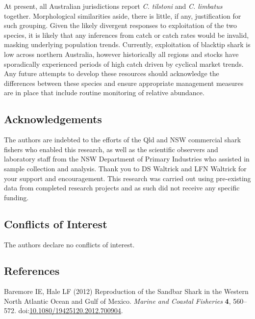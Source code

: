 \documentclass[]{article}
\begin{document}
At present, all Australian jurisdictions report \emph{C. tilstoni} and
\emph{C. limbatus} together. Morphological similarities aside, there is
little, if any, justification for such grouping. Given the likely
divergent responses to exploitation of the two species, it is likely
that any inferences from catch or catch rates would be invalid, masking
underlying population trends. Currently, exploitation of blacktip shark
is low across northern Australia, however historically all regions and
stocks have sporadically experienced periods of high catch driven by
cyclical market trends. Any future attempts to develop these resources
should acknowledge the differences between these species and ensure
appropriate management measures are in place that include routine
monitoring of relative abundance.

\hypertarget{acknowledgements}{%
\subsection{Acknowledgements}\label{acknowledgements}}

The authors are indebted to the efforts of the Qld and NSW commercial
shark fishers who enabled this research, as well as the scientific
observers and laboratory staff from the NSW Department of Primary
Industries who assisted in sample collection and analysis. Thank you to
DS Waltrick and LFN Waltrick for your support and encouragement. This
research was carried out using pre-existing data from completed research
projects and as such did not receive any specific funding.

\hypertarget{conflicts-of-interest}{%
\subsection{Conflicts of Interest}\label{conflicts-of-interest}}

The authors declare no conflicts of interest.

\newpage

\hypertarget{references}{%
\subsection*{References}\label{references}}

\hypertarget{refs}{}
\leavevmode\hypertarget{ref-baremore_reproduction_2012}{}%
Baremore IE, Hale LF (2012) Reproduction of the Sandbar Shark in the
Western North Atlantic Ocean and Gulf of Mexico. \emph{Marine and
Coastal Fisheries} \textbf{4}, 560--572.
doi:\href{https://doi.org/10.1080/19425120.2012.700904}{10.1080/19425120.2012.700904}.
\end{document}
